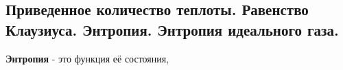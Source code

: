 \subsection{Приведенное количество теплоты. Равенство Клаузиуса. Энтропия. Энтропия идеального газа.}

\textbf{Энтропия} - это функция её состояния,